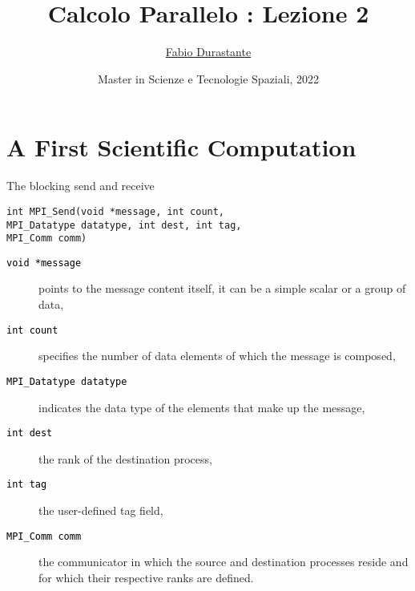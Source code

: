 \documentclass[xcolor={svgnames,usenames}]{beamer}
\title[Calcolo Parallelo]{Calcolo Parallelo : Lezione 2}
\author[F. Durastante]{
    \href{mailto:fabio.durastante@nunipi.it}{Fabio Durastante}
}
\institute{Dipartimento di Matematica, Università di Pisa}
\date[Maggio 2021]{Master in Scienze e Tecnologie Spaziali, 2022}
\begin{document}
\begin{frame}
	\titlepage
\end{frame}

\section[Outline]{}
\frame{\tableofcontents}

\section{A First Scientific Computation}

\begin{frame}[fragile]{The blocking send and receive}
\begin{verbatim}
int MPI_Send(void *message, int count, 
MPI_Datatype datatype, int dest, int tag, 
MPI_Comm comm)
\end{verbatim}
\begin{description}
	\item[\textcolor{black}{\texttt{void *message}}] points to the message content itself, it can be a simple scalar or a group of data,
	\item[\textcolor{black}{\texttt{int count}}] specifies the number of data elements of which the message is composed,
	\item[\textcolor{black}{\texttt{MPI_Datatype datatype}}] indicates the \alert{data type} of the elements that make up the message,
	\item[\textcolor{black}{\texttt{int dest}}] the rank of the destination process, 
	\item[\textcolor{black}{\texttt{int tag}}] the user-defined tag field, 
	\item[\textcolor{black}{\texttt{MPI_Comm comm}}] the communicator in which the source and destination processes reside and for which their respective
	ranks are defined.
\end{description}
\end{frame}
\end{document}
